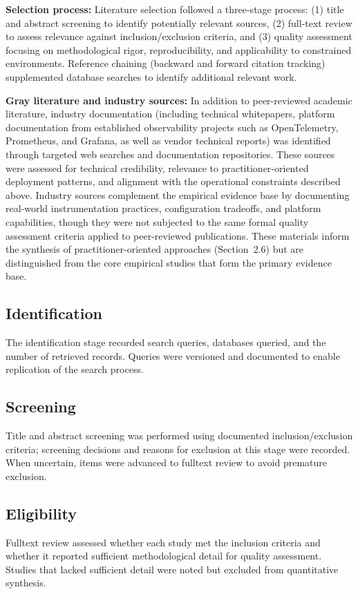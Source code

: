 \textbf{Selection process:}
Literature selection followed a three-stage process: (1) title and abstract screening to identify potentially relevant sources, (2) full-text review to assess relevance against inclusion/exclusion criteria, and (3) quality assessment focusing on methodological rigor, reproducibility, and applicability to constrained environments. Reference chaining (backward and forward citation tracking) supplemented database searches to identify additional relevant work.

\textbf{Gray literature and industry sources:}
In addition to peer-reviewed academic literature, industry documentation (including technical whitepapers, platform documentation from established observability projects such as \gls{OpenTelemetry}, Prometheus, and Grafana, as well as vendor technical reports) was identified through targeted web searches and documentation repositories. These sources were assessed for technical credibility, relevance to practitioner-oriented deployment patterns, and alignment with the operational constraints described above. Industry sources complement the empirical evidence base by documenting real-world instrumentation practices, configuration tradeoffs, and platform capabilities, though they were not subjected to the same formal quality assessment criteria applied to peer-reviewed publications. These materials inform the synthesis of practitioner-oriented approaches (Section~2.6) but are distinguished from the core empirical studies that form the primary evidence base.
\subsection{Identification}
The identification stage recorded search queries, databases queried, and the number of retrieved records. Queries were versioned and documented to enable replication of the search process.

\subsection{Screening}
Title and abstract screening was performed using documented inclusion/exclusion criteria; screening decisions and reasons for exclusion at this stage were recorded. When uncertain, items were advanced to full\-text review to avoid premature exclusion.

\subsection{Eligibility}
Full\-text review assessed whether each study met the inclusion criteria and whether it reported sufficient methodological detail for quality assessment. Studies that lacked sufficient detail were noted but excluded from quantitative synthesis.

